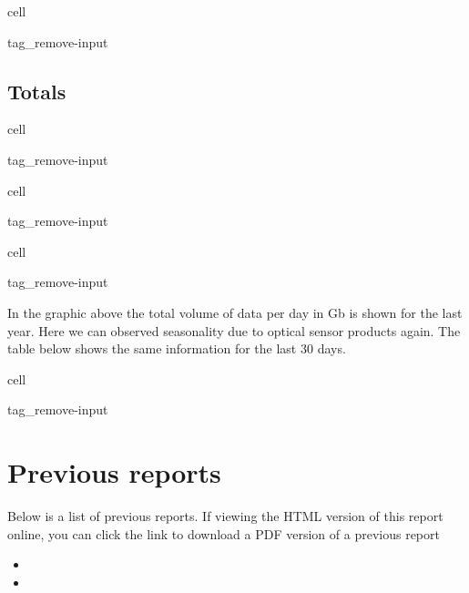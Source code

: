 \documentclass[letterpaper,10pt,english]{jupyterBook}
\begin{document}
\begin{sphinxuseclass}{cell}
\begin{sphinxuseclass}{tag_remove-input}
\end{sphinxuseclass}
\end{sphinxuseclass}

\section{Totals}
\label{\detokenize{volumes:totals}}
\begin{sphinxuseclass}{cell}
\begin{sphinxuseclass}{tag_remove-input}
\end{sphinxuseclass}
\end{sphinxuseclass}
\begin{sphinxuseclass}{cell}
\begin{sphinxuseclass}{tag_remove-input}
\end{sphinxuseclass}
\end{sphinxuseclass}
\begin{sphinxuseclass}{cell}
\begin{sphinxuseclass}{tag_remove-input}
\end{sphinxuseclass}
\end{sphinxuseclass}
\sphinxAtStartPar
In the graphic above the total volume of data per day in Gb is shown for the last year. Here we can observed seasonality due to optical sensor products again. The table below shows the same information for the last 30 days.

\begin{sphinxuseclass}{cell}
\begin{sphinxuseclass}{tag_remove-input}
\end{sphinxuseclass}
\end{sphinxuseclass}
\sphinxstepscope


\chapter{Previous reports}
\label{\detokenize{previous_reports:previous-reports}}\label{\detokenize{previous_reports::doc}}
\sphinxAtStartPar
Below is a list of previous reports. If viewing the HTML version of this report online, you can click the link to download a PDF version of a previous report
\begin{itemize}
\item {} 
\sphinxAtStartPar
{}

\item {} 
\sphinxAtStartPar
{}

\end{itemize}







\renewcommand{\indexname}{Index}
\printindex
\end{document}
